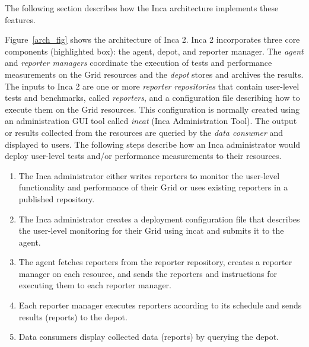 \documentclass[times,10pt,twocolumn]{article}
\begin{document}
\noindent The following section describes how the Inca architecture implements
these features.


Figure~\ref{arch_fig} shows the architecture of Inca 2.
Inca 2 incorporates three core
components (highlighted box):  the agent, depot, and reporter manager.
The \textit{agent} and \textit{reporter managers} coordinate the execution of
tests and performance measurements on the Grid resources and the
\textit{depot} stores and archives the results.  The inputs to Inca 2 are one
or more \textit{reporter repositories} that contain user-level tests and
benchmarks, called \textit{reporters}, and a configuration file describing how
to execute them on the Grid resources.  This configuration is normally created
using an administration GUI tool
called \textit{incat} (Inca Administration Tool).  The output or results
collected from the resources are queried by the \textit{data consumer} and
displayed to users.  The following steps describe how an Inca administrator
would deploy user-level tests and/or performance measurements to their
resources.

\begin{enumerate}

\item The Inca
administrator either writes reporters to monitor the user-level functionality
and performance of their Grid or uses existing
reporters in a published repository.

\item The Inca administrator creates a deployment configuration file that
describes the user-level monitoring for their Grid using incat and submits it
to the agent.

\item The agent fetches reporters from the reporter repository, creates a
reporter manager on each resource, and sends the reporters and instructions for
executing them to each reporter manager.

\item Each reporter manager executes reporters according to its schedule and
sends results (reports) to the depot.

\item Data consumers display collected data (reports) by querying the depot.
\end{enumerate}
\end{document}
